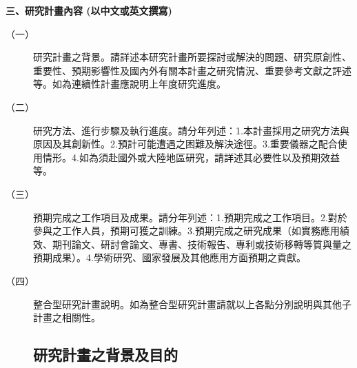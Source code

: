 \documentclass[12pt,a4paper]{article}
\begin{document}
\newtheorem{thm}{Theorem}
\newtheorem{lem}{Lemma}
\newtheorem{cor}{Corollary}
\newtheorem{prop}{Proposition}
\newtheorem{conj}{Conjecture}

\baselineskip 7mm

\noindent
\textbf{\large 三、研究計畫內容 (以中文或英文撰寫)}
\begin{description}
\item[（一）]研究計畫之背景。請詳述本研究計畫所要探討或解決的問題、研究原創性、重要性、預期影響性及國內外有關本計畫之研究情況、重要參考文獻之評述等。如為連續性計畫應說明上年度研究進度。
\item[（二）]研究方法、進行步驟及執行進度。請分年列述：1.本計畫採用之研究方法與原因及其創新性。2.預計可能遭遇之困難及解決途徑。3.重要儀器之配合使用情形。4.如為須赴國外或大陸地區研究，請詳述其必要性以及預期效益等。
\item[（三）]預期完成之工作項目及成果。請分年列述：1.預期完成之工作項目。2.對於參與之工作人員，預期可獲之訓練。3.預期完成之研究成果（如實務應用績效、期刊論文、研討會論文、專書、技術報告、專利或技術移轉等質與量之預期成果）。4.學術研究、國家發展及其他應用方面預期之貢獻。
\item[（四）]整合型研究計畫說明。如為整合型研究計畫請就以上各點分別說明與其他子計畫之相關性。

\setlength\parindent{2em}    %

\setcounter{section}{3}
\setcounter{subsection}{0}

\subsection{研究計畫之背景及目的}

\end{description}
\end{document}
